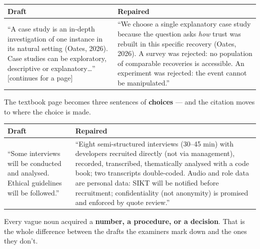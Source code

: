 \documentclass[11pt,a4paper,british,twoside=false,headings=small,chapterprefix=false,numbers=noenddot]{scrbook}
\begin{document}
\begin{center}\small
\small
  \renewcommand{\arraystretch}{1.4}
  \begin{tabular}{@{}p{6.3cm}p{6.5cm}@{}}
    \toprule
    \textbf{Draft} & \textbf{Repaired}\\
    \midrule
    ``A case study is an in-depth investigation of one instance in its natural setting (Oates, 2026). Case studies can be exploratory, descriptive or explanatory\dots'' [continues for a page] & ``We choose a single explanatory case study because the question asks \emph{how} trust was rebuilt in this specific recovery (Oates, 2026). A survey was rejected: no population of comparable recoveries is accessible. An experiment was rejected: the event cannot be manipulated.''\\
    \bottomrule
  \end{tabular}
  

  The textbook page becomes three sentences of \textbf{choices} --- and the
  citation moves to where the choice is made.
\end{center}

\begin{center}\small
\small
  \renewcommand{\arraystretch}{1.4}
  \begin{tabular}{@{}p{6.3cm}p{6.5cm}@{}}
    \toprule
    \textbf{Draft} & \textbf{Repaired}\\
    \midrule
    ``Some interviews will be conducted and analysed. Ethical guidelines will be followed.'' & ``Eight semi-structured interviews (30--45 min) with developers recruited directly (not via management), recorded, transcribed, thematically analysed with a code book; two transcripts double-coded. Audio and role data are personal data: SIKT will be notified before recruitment; confidentiality (not anonymity) is promised and enforced by quote review.''\\
    \bottomrule
  \end{tabular}
  

  Every vague noun acquired a \textbf{number, a procedure, or a decision}.
  That is the whole difference between the drafts the examiners mark down and
  the ones they don't.
\end{center}
\end{document}
